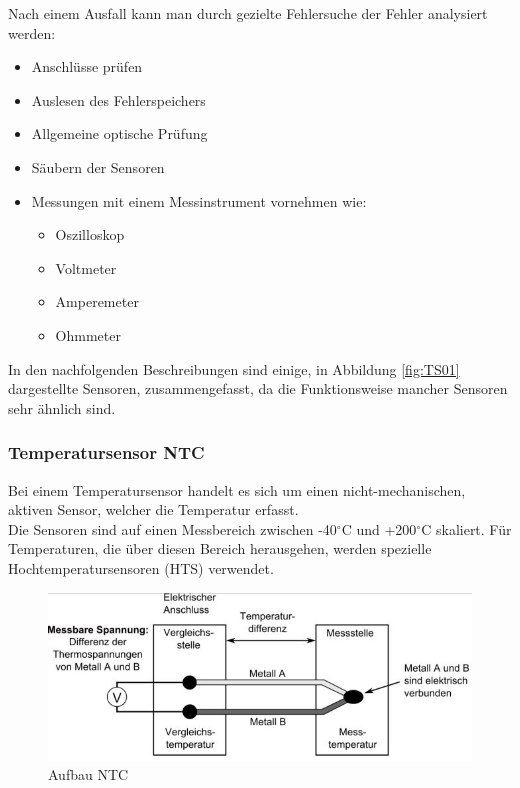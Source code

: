 	        Nach einem Ausfall kann man durch gezielte Fehlersuche der Fehler analysiert werden:
	
	        \begin{itemize}
	            \item Anschlüsse prüfen
	            \item Auslesen des Fehlerspeichers
	            \item Allgemeine optische Prüfung
	            \item Säubern der Sensoren
	            \item Messungen mit einem Messinstrument vornehmen wie:
	            \begin{itemize}
	                \item Oszilloskop 
	                \item Voltmeter
	                \item Amperemeter
	                \item Ohmmeter	
	            \end{itemize}
	            
	        \end{itemize}
	
			In den nachfolgenden Beschreibungen sind einige, in Abbildung \ref{fig:TS01} dargestellte Sensoren, zusammengefasst, da die Funktionsweise mancher Sensoren sehr ähnlich sind.
			
	        \subsubsection{Temperatursensor NTC}
				Bei einem Temperatursensor handelt es sich um einen nicht-mechanischen, aktiven	Sensor, welcher die Temperatur erfasst.\\
	            Die Sensoren sind auf einen Messbereich zwischen -40$^\circ$C und +200$^\circ$C skaliert.
	            Für Temperaturen, die über diesen Bereich herausgehen, werden spezielle Hochtemperatursensoren (HTS) verwendet.
	
	            \begin{figure}[h]
				
		        	\includegraphics[width=\textwidth]{aufbau_ntc.png}
		            \caption[www.kfztech.de/kfztechnik/elo/sensoren/ntc.htm]{Aufbau NTC}
		            \label{fig:TS02}
	            
				\end{figure}
	
